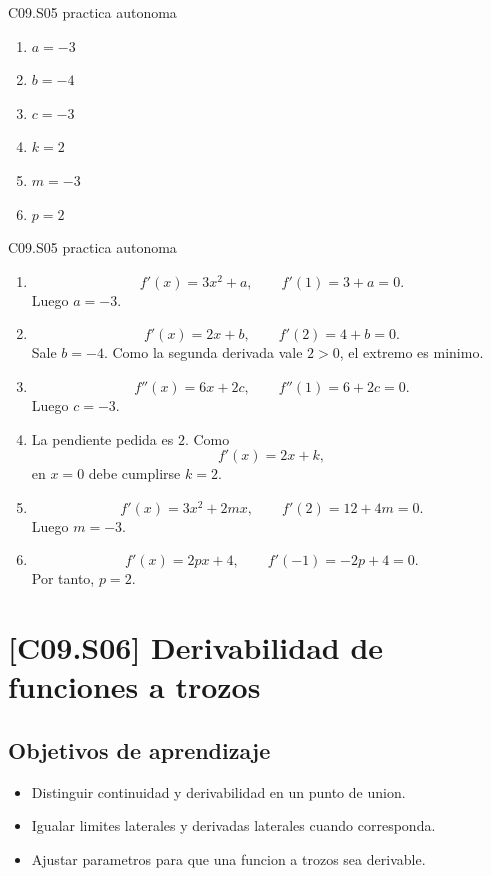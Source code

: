\begin{shortanswer}{C09.S05 practica autonoma}
\begin{enumerate}[label=\textbf{PX-C09.S05-\arabic*:}, leftmargin=*]
  \item \(a=-3\)
  \item \(b=-4\)
  \item \(c=-3\)
  \item \(k=2\)
  \item \(m=-3\)
  \item \(p=2\)
\end{enumerate}
\end{shortanswer}

\begin{fullsolution}{C09.S05 practica autonoma}
\begin{enumerate}[label=\textbf{PX-C09.S05-\arabic*:}, leftmargin=*]
  \item
  \[
  f'(x)=3x^2+a,\qquad f'(1)=3+a=0.
  \]
  Luego \(a=-3\).
  \item
  \[
  f'(x)=2x+b,\qquad f'(2)=4+b=0.
  \]
  Sale \(b=-4\). Como la segunda derivada vale \(2>0\), el extremo es minimo.
  \item
  \[
  f''(x)=6x+2c,\qquad f''(1)=6+2c=0.
  \]
  Luego \(c=-3\).
  \item La pendiente pedida es \(2\). Como
  \[
  f'(x)=2x+k,
  \]
  en \(x=0\) debe cumplirse \(k=2\).
  \item
  \[
  f'(x)=3x^2+2mx,\qquad f'(2)=12+4m=0.
  \]
  Luego \(m=-3\).
  \item
  \[
  f'(x)=2px+4,\qquad f'(-1)=-2p+4=0.
  \]
  Por tanto, \(p=2\).
\end{enumerate}
\end{fullsolution}

\section{[C09.S06] Derivabilidad de funciones a trozos}

\subsection*{Objetivos de aprendizaje}
\begin{itemize}
  \item Distinguir continuidad y derivabilidad en un punto de union.
  \item Igualar limites laterales y derivadas laterales cuando corresponda.
  \item Ajustar parametros para que una funcion a trozos sea derivable.
\end{itemize}

